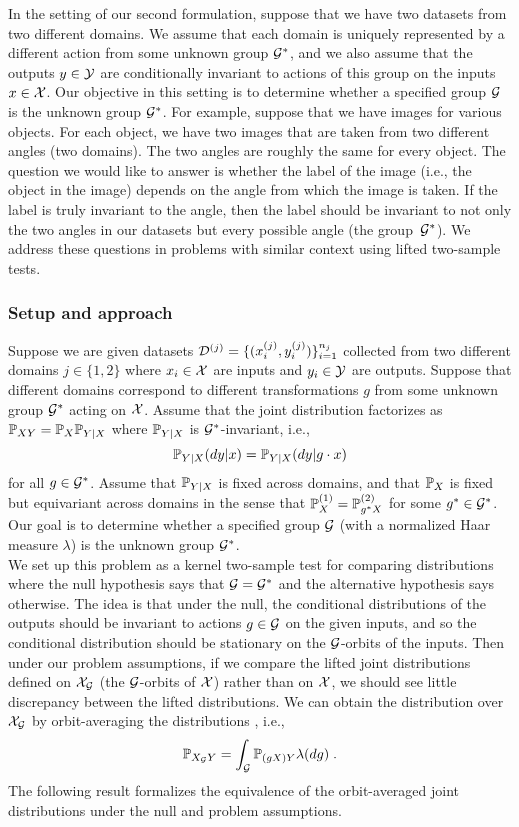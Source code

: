 In the setting of our second formulation, suppose that we have two datasets from two different domains. We assume that each domain is uniquely represented by a different action from some unknown group $\calG^*$, and we also assume that the outputs $y\in\calY$ are conditionally invariant to actions of this group on the inputs $x\in\calX$. Our objective in this setting is to determine whether a specified group $\calG$ is the unknown group $\calG^*$. For example, suppose that we have images for various objects. For each object, we have two images that are taken from two different angles (two domains). The two angles are roughly the same for every object. The question we would like to answer is whether the label of the image (i.e., the object in the image) depends on the angle from which the image is taken. If the label is truly invariant to the angle, then the label should be invariant to not only the two angles in our datasets but every possible angle (the group~$\calG^*$). We address these questions in problems with similar context using lifted two-sample tests.

\subsubsection{Setup and approach}

Suppose we are given datasets $\calD^{(j)}=\{(x_i^{(j)},y_i^{(j)})\}_{i=1}^{n_j}$ collected from two different domains $j\in\{1,2\}$ where $x_i\in\calX$ are inputs and $y_i\in\calY$ are outputs. Suppose that different domains correspond to different transformations $g$ from some unknown group $\calG^*$ acting on $\calX$. Assume that the joint distribution factorizes as $\P_{XY}=\P_X\P_{Y|X}$ where $\P_{Y|X}$ is $\calG^*$-invariant, i.e.,
\[
\bbP_{Y|X}(dy|x) = \bbP_{Y|X}(dy|g\cdot x)
\]
for all $g\in\calG^*$. Assume that $\P_{Y|X}$ is fixed across domains, and that $\P_X$ is fixed but equivariant across domains in the sense that $\P_X^{(1)}=\P_{g^*X}^{(2)}$ for some $g^*\in\calG^*$. Our goal is to determine whether a specified group $\calG$ (with a normalized Haar measure $\lambda$) is the unknown group $\calG^*$.
\\

We set up this problem as a kernel two-sample test for comparing distributions where the null hypothesis says that $\calG=\calG^*$ and the alternative hypothesis says otherwise. The idea is that under the null, the conditional distributions of the outputs should be invariant to actions $g\in\calG$ on the given inputs, and so the conditional distribution should be stationary on the $\calG$-orbits of the inputs. Then under our problem assumptions, if we compare the lifted joint distributions defined on $\calX_\calG$ (the $\calG$-orbits of $\calX$) rather than on $\calX$, we should see little discrepancy between the lifted distributions. We can obtain the distribution over $\calX_\calG$ by orbit-averaging the distributions \parencite{Eaton:2007}, i.e.,
\[
\P_{X_\calG Y} = \int_\calG\P_{(gX)Y}\lambda(dg) \;.
\]
The following result formalizes the equivalence of the orbit-averaged joint distributions under the null and problem assumptions.

